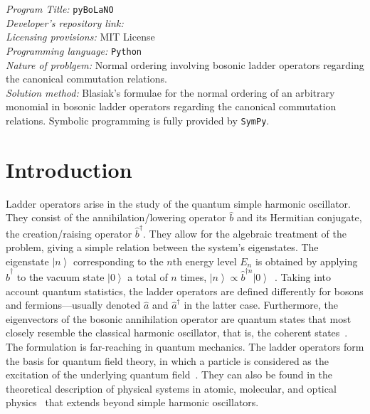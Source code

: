 \documentclass[onecolumn, 12pt, sort&compress]{elsarticle}
\newcommand{\ket}[1]{\left|{#1}\right\rangle}
\newcommand{\bop}{\hat{b}}
\newcommand{\bdag}{\bop^\dagger}
\newenvironment{revision}{%
\color{red}
}
{}
\begin{document}


\begin{small}
\noindent
{\em Program Title:} \texttt{pyBoLaNO}
\\
{\em Developer's repository link:} \href{https://github.com/hendry24/pyBoLaNO}{}
\\
{\em Licensing provisions:} MIT License
\\
{\em Programming language:} \texttt{Python}
\\
{\em Nature of problgem:} Normal ordering involving bosonic ladder operators \begin{revision} regarding the canonical commutation relations. \end{revision}
\\
{\em Solution method:} Blasiak's formulae for the normal ordering of an arbitrary monomial in bosonic ladder operators \begin{revision}regarding the canonical commutation relations.\end{revision} Symbolic programming is fully provided by \texttt{SymPy}.
\end{small}


\section{Introduction}
\label{Introduction}

Ladder operators arise in the study of the quantum simple harmonic oscillator. They consist of the annihilation/lowering operator $\bop$ and its Hermitian conjugate, the creation/raising operator $\bdag$. They allow for the algebraic treatment of the problem, giving a simple relation between the system's eigenstates. The eigenstate $\ket{n}$ corresponding to the $n$th energy level $E_n$ is obtained by applying $\hat{b}^\dagger$ to the vacuum state $\ket{0}$ a total of $n$ times, $\ket{n}\propto\hat{b}^{\dagger n}\ket{0}$~\cite{griffiths_introduction_2018, lancaster_quantum_2014}. Taking into account quantum statistics, the ladder operators are defined differently for bosons and fermions---usually denoted $\hat{a}$ and $\hat{a}^\dagger$ in the latter case. Furthermore, the eigenvectors of the bosonic annihilation operator are quantum states that most closely resemble the classical harmonic oscillator, that is, the coherent states~\cite{gerry_introductory_2005}. The formulation is far-reaching in quantum mechanics. The ladder operators form the basis for quantum field theory, in which a particle is considered as the excitation of the underlying quantum field~\cite{lancaster_quantum_2014}. They can also be found in the theoretical description of physical systems in atomic, molecular, and optical physics~\cite{gerry_introductory_2005} that extends beyond simple harmonic oscillators.
\end{document}
